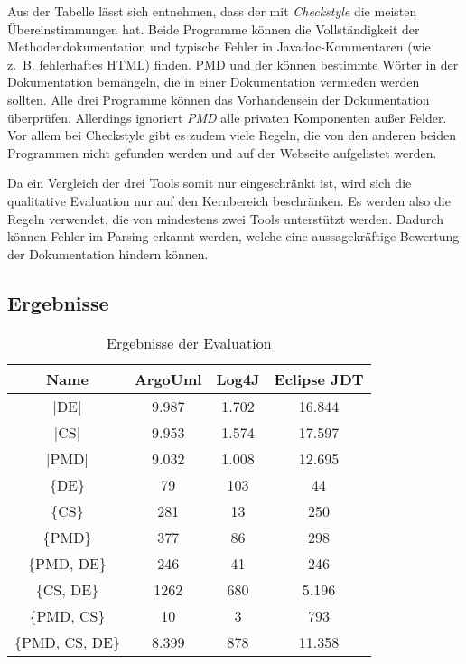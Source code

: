 Aus der Tabelle lässt sich entnehmen, dass der \doceval mit \textit{Checkstyle} die meisten Übereinstimmungen hat. Beide Programme können die Vollständigkeit der Methodendokumentation und typische Fehler in Javadoc-Kommentaren (wie z.~B. fehlerhaftes HTML) finden. PMD und der \doceval können bestimmte Wörter in der Dokumentation bemängeln, die in einer Dokumentation vermieden werden sollten. Alle drei Programme können das Vorhandensein der Dokumentation überprüfen. Allerdings ignoriert \textit{PMD} alle privaten Komponenten außer Felder. Vor allem bei Checkstyle gibt es zudem viele Regeln, die von den anderen beiden Programmen nicht gefunden werden und auf der Webseite \cite{checkstyle_doc_metrics} aufgelistet werden.

Da ein Vergleich der drei Tools somit nur eingeschränkt ist, wird sich die qualitative Evaluation nur auf den Kernbereich beschränken. Es werden also die Regeln verwendet, die von mindestens zwei Tools unterstützt werden. Dadurch können Fehler im Parsing erkannt werden, welche eine aussagekräftige  Bewertung der Dokumentation hindern können. 



\subsection{Ergebnisse}


\begin{table}[]
    \centering
    \begin{tabular}{c|c|c|c}
    Name & ArgoUml & Log4J & Eclipse JDT\\\hline
    |DE| & 9.987 & 1.702 & 16.844\\\hline
    |CS| & 9.953 & 1.574 & 17.597\\\hline
    |PMD|& 9.032 & 1.008 & 12.695\\\hline
    
    \{DE\} & 79 & 103 & 44\\\hline
    \{CS\} & 281 & 13 & 250\\\hline
    \{PMD\} & 377 & 86 & 298\\\hline
    \{PMD, DE\} & 246 & 41 & 246\\\hline
    \{CS, DE\} & 1262 & 680 & 5.196\\\hline
    \{PMD, CS\} & 10 & 3 & 793\\\hline
    \{PMD, CS, DE\} & 8.399 & 878 & 11.358\\\hline
    \end{tabular}
    \caption{Ergebnisse der Evaluation}
    \label{tab:eval_results}
\end{table}
